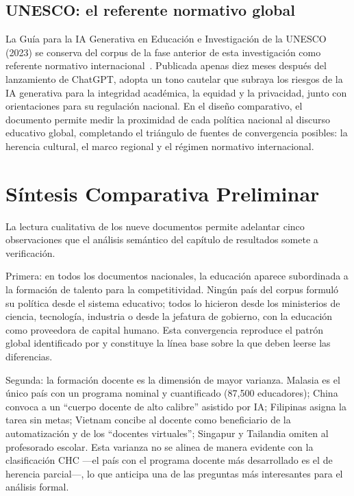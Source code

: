 \subsection{UNESCO: el referente normativo global}
\label{subsec:unesco-contexto}

La Guía para la IA Generativa en Educación e Investigación de la UNESCO (2023) se conserva del corpus de la fase anterior de esta investigación como referente normativo internacional~\citep{unesco2023genai}. Publicada apenas diez meses después del lanzamiento de ChatGPT, adopta un tono cautelar que subraya los riesgos de la IA generativa para la integridad académica, la equidad y la privacidad, junto con orientaciones para su regulación nacional. En el diseño comparativo, el documento permite medir la proximidad de cada política nacional al discurso educativo global, completando el triángulo de fuentes de convergencia posibles: la herencia cultural, el marco regional y el régimen normativo internacional.


\section{Síntesis Comparativa Preliminar}
\label{sec:sintesis-preliminar}

La lectura cualitativa de los nueve documentos permite adelantar cinco observaciones que el análisis semántico del capítulo de resultados somete a verificación.

Primera: en todos los documentos nacionales, la educación aparece subordinada a la formación de talento para la competitividad. Ningún país del corpus formuló su política desde el sistema educativo; todos lo hicieron desde los ministerios de ciencia, tecnología, industria o desde la jefatura de gobierno, con la educación como proveedora de capital humano. Esta convergencia reproduce el patrón global identificado por \citet{fatima2020aipolicy} y constituye la línea base sobre la que deben leerse las diferencias.

Segunda: la formación docente es la dimensión de mayor varianza. Malasia es el único país con un programa nominal y cuantificado (87,500 educadores); China convoca a un ``cuerpo docente de alto calibre'' asistido por IA; Filipinas asigna la tarea sin metas; Vietnam concibe al docente como beneficiario de la automatización y de los ``docentes virtuales''; Singapur y Tailandia omiten al profesorado escolar. Esta varianza no se alinea de manera evidente con la clasificación CHC —el país con el programa docente más desarrollado es el de herencia parcial—, lo que anticipa una de las preguntas más interesantes para el análisis formal.

